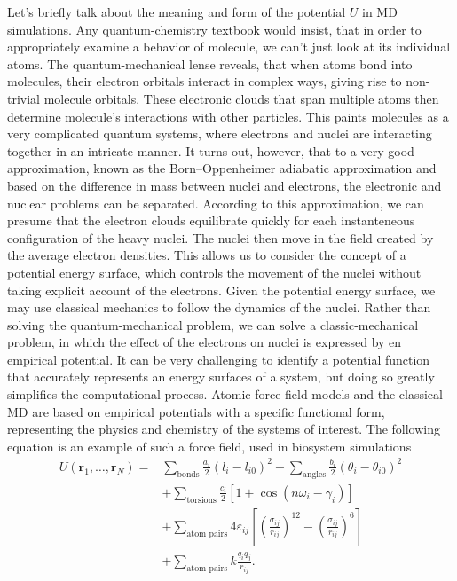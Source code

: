 Let's briefly talk about the meaning and form of the potential $U$
in MD simulations. Any quantum-chemistry textbook would insist, that in order
to appropriately examine a behavior of molecule, we can't just look at its
individual atoms. The quantum-mechanical lense reveals, that when atoms bond
into molecules, their electron orbitals interact in complex ways, giving rise
to non-trivial molecule orbitals. These electronic clouds that span multiple
atoms then determine molecule's interactions with other particles. This paints
molecules as a very complicated quantum systems, where electrons and nuclei
are interacting together in an intricate manner. It turns out, however, that
to a very good approximation, known as the Born–Oppenheimer adiabatic
approximation and based on the difference in mass between nuclei and
electrons, the electronic and nuclear problems can be separated. According to
this approximation, we can presume that the electron clouds equilibrate
quickly for each instanteneous configuration of the heavy nuclei. The nuclei
then move in the field created by the average electron densities.
This allows us to consider the concept of a potential energy surface, which
controls the movement of the nuclei without taking explicit account of the
electrons. Given the potential energy surface, we may use classical mechanics
to follow the dynamics of the nuclei. Rather than solving the
quantum-mechanical problem, we can solve a classic-mechanical problem, in
which the effect of the electrons on nuclei is expressed by en empirical
potential. It can be very challenging to identify a potential function that
accurately represents an energy surfaces of a system, but doing so greatly
simplifies the computational process. Atomic force field models and the
classical MD are based on empirical potentials with a specific functional
form, representing the physics and chemistry of the systems of
interest. The following equation is an example of such a force field, used in
biosystem simulations
\begin{equation}
\begin{alignedat}{2}
  U(\mathbf{r}_1, \dots, \mathbf{r}_N) = &
  \sum_\text{bonds} \frac{a_i}{2} (l_i - l_{i0})^2
  + \sum_\text{angles} \frac{b_i}{2} (\theta_i - \theta_{i0})^2 \\
  &+ \sum_\text{torsions} \frac{c_i}{2} \left[
    1 + \cos(n \omega_i - \gamma_i)
  \right] \\
  &+ \sum_\text{atom pairs} 4 \varepsilon_{ij} \left[
    \left(\frac{\sigma_{ij}}{r_{ij}}\right)^{12}
    - \left(\frac{\sigma_{ij}}{r_{ij}}\right)^{6}
  \right] \\
  &+ \sum_\text{atom pairs} k \frac{q_i q_j}{r_{ij}}.
\end{alignedat}
\end{equation}
